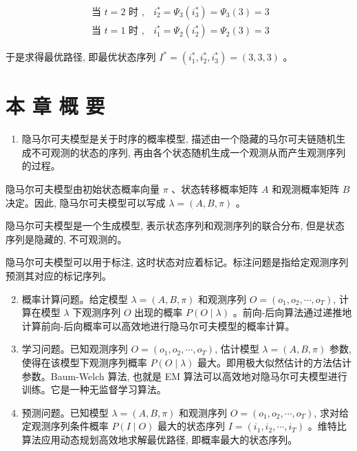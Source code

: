 \documentclass[10pt]{article}
\begin{document}
\begin{CJK*}{UTF8}{bsmi}
$$
\begin{array}{ll}
\text { 当 } t=2 \text { 时 }, & i_{2}^{*}=\Psi_{3}\left(i_{3}^{*}\right)=\Psi_{3}(3)=3 \\
\text { 当 } t=1 \text { 时 }, & i_{1}^{*}=\Psi_{2}\left(i_{2}^{*}\right)=\Psi_{2}(3)=3
\end{array}
$$

于是求得最优路径, 即最优状态序列 $I^{*}=\left(i_{1}^{*}, i_{2}^{*}, i_{3}^{*}\right)=(3,3,3)$ 。

\section*{本 章 概 要}
\begin{enumerate}
  \item 隐马尔可夫模型是关于时序的概率模型, 描述由一个隐藏的马尔可夫链随机生成不可观测的状态的序列, 再由各个状态随机生成一个观测从而产生观测序列的过程。
\end{enumerate}

隐马尔可夫模型由初始状态概率向量 $\pi$ 、状态转移概率矩阵 $A$ 和观测概率矩阵 $B$ 决定。因此, 隐马尔可夫模型可以写成 $\lambda=(A, B, \pi)$ 。

隐马尔可夫模型是一个生成模型, 表示状态序列和观测序列的联合分布, 但是状态序列是隐藏的, 不可观测的。

隐马尔可夫模型可以用于标注, 这时状态对应着标记。标注问题是指给定观测序列预测其对应的标记序列。

\begin{enumerate}
  \setcounter{enumi}{1}
  \item 概率计算问题。给定模型 $\lambda=(A, B, \pi)$ 和观测序列 $O=\left(o_{1}, o_{2}, \cdots, o_{T}\right)$, 计算在模型 $\lambda$ 下观测序列 $O$ 出现的概率 $P(O \mid \lambda)$ 。前向-后向算法通过递推地计算前向-后向概率可以高效地进行隐马尔可夫模型的概率计算。

  \item 学习问题。已知观测序列 $O=\left(o_{1}, o_{2}, \cdots, o_{T}\right)$, 估计模型 $\lambda=(A, B, \pi)$ 参数, 使得在该模型下观测序列概率 $P(O \mid \lambda)$ 最大。即用极大似然估计的方法估计参数。Baum-Welch 算法, 也就是 EM 算法可以高效地对隐马尔可夫模型进行训练。它是一种无监督学习算法。

  \item 预测问题。已知模型 $\lambda=(A, B, \pi)$ 和观测序列 $O=\left(o_{1}, o_{2}, \cdots, o_{T}\right)$, 求对给定观测序列条件概率 $P(I \mid O)$ 最大的状态序列 $I=\left(i_{1}, i_{2}, \cdots, i_{T}\right)$ 。维特比算法应用动态规划高效地求解最优路径, 即概率最大的状态序列。


\end{enumerate}
\end{CJK*}
\end{document}
